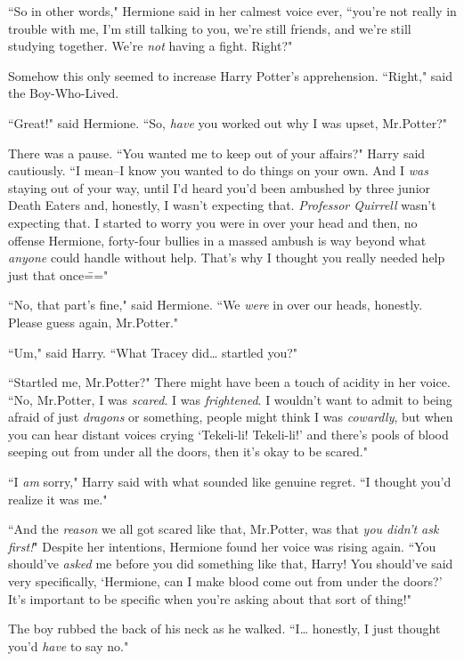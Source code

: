 ``So in other words," Hermione said in her calmest voice ever, ``you're not really in trouble with me, I'm still talking to you, we're still friends, and we're still studying together. We're \emph{not} having a fight. Right?"

Somehow this only seemed to increase Harry Potter's apprehension. ``Right," said the Boy-Who-Lived.

``Great!" said Hermione. ``So, \emph{have} you worked out why I was upset, Mr.\?Potter?"

There was a pause. ``You wanted me to keep out of your affairs?" Harry said cautiously. ``I mean\---I know you wanted to do things on your own. And I \emph{was} staying out of your way, until I'd heard you'd been ambushed by three junior Death Eaters and, honestly, I wasn't expecting that. \emph{Professor Quirrell} wasn't expecting that. I started to worry you were in over your head and then, no offense Hermione, forty-four bullies in a massed ambush is way beyond what \emph{anyone} could handle without help. That's why I thought you really needed help just that once\==="

``No, that part's fine," said Hermione. ``We \emph{were} in over our heads, honestly. Please guess again, Mr.\?Potter."

``Um," said Harry. ``What Tracey did{\ldots} startled you?"

``Startled me, Mr.\?Potter?" There might have been a touch of acidity in her voice. ``No, Mr.\?Potter, I was \emph{scared}. I was \emph{frightened}. I wouldn't want to admit to being afraid of just \emph{dragons} or something, people might think I was \emph{cowardly}, but when you can hear distant voices crying `Tekeli-li! Tekeli-li!' and there's pools of blood seeping out from under all the doors, then it's okay to be scared."

``I \emph{am} sorry," Harry said with what sounded like genuine regret. ``I thought you'd realize it was me."

``And the \emph{reason} we all got scared like that, Mr.\?Potter, was that \emph{you didn't ask first!}" Despite her intentions, Hermione found her voice was rising again. ``You should've \emph{asked} me before you did something like that, Harry! You should've said very specifically, `Hermione, can I make blood come out from under the doors?' It's important to be specific when you're asking about that sort of thing!"

The boy rubbed the back of his neck as he walked. ``I{\ldots} honestly, I just thought you'd \emph{have} to say no."

